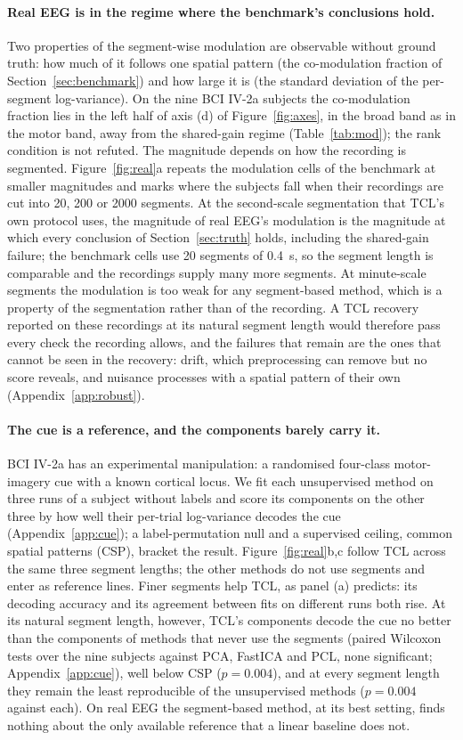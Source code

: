 \paragraph{Real EEG is in the regime where the benchmark's conclusions hold.}
Two properties of the segment-wise modulation are observable without ground truth: how much of it follows one spatial pattern (the co-modulation fraction of Section~\ref{sec:benchmark}) and how large it is (the standard deviation of the per-segment log-variance).
On the nine BCI IV-2a subjects the co-modulation fraction lies in the left half of axis (d) of Figure~\ref{fig:axes}, in the broad band as in the motor band, away from the shared-gain regime (Table~\ref{tab:mod}); the rank condition is not refuted.
The magnitude depends on how the recording is segmented.
Figure~\ref{fig:real}a repeats the modulation cells of the benchmark at smaller magnitudes and marks where the subjects fall when their recordings are cut into 20, 200 or 2000 segments.
At the second-scale segmentation that TCL's own protocol uses, the magnitude of real EEG's modulation is the magnitude at which every conclusion of Section~\ref{sec:truth} holds, including the shared-gain failure; the benchmark cells use 20 segments of 0.4~s, so the segment length is comparable and the recordings supply many more segments.
At minute-scale segments the modulation is too weak for any segment-based method, which is a property of the segmentation rather than of the recording.
A TCL recovery reported on these recordings at its natural segment length would therefore pass every check the recording allows, and the failures that remain are the ones that cannot be seen in the recovery: drift, which preprocessing can remove but no score reveals, and nuisance processes with a spatial pattern of their own (Appendix~\ref{app:robust}).

\paragraph{The cue is a reference, and the components barely carry it.}
BCI IV-2a has an experimental manipulation: a randomised four-class motor-imagery cue with a known cortical locus.
We fit each unsupervised method on three runs of a subject without labels and score its components on the other three by how well their per-trial log-variance decodes the cue (Appendix~\ref{app:cue}); a label-permutation null and a supervised ceiling, common spatial patterns (CSP), bracket the result.
Figure~\ref{fig:real}b,c follow TCL across the same three segment lengths; the other methods do not use segments and enter as reference lines.
Finer segments help TCL, as panel (a) predicts: its decoding accuracy and its agreement between fits on different runs both rise.
At its natural segment length, however, TCL's components decode the cue no better than the components of methods that never use the segments (paired Wilcoxon tests over the nine subjects against PCA, FastICA and PCL, none significant; Appendix~\ref{app:cue}), well below CSP ($p = 0.004$), and at every segment length they remain the least reproducible of the unsupervised methods ($p = 0.004$ against each).
On real EEG the segment-based method, at its best setting, finds nothing about the only available reference that a linear baseline does not.
